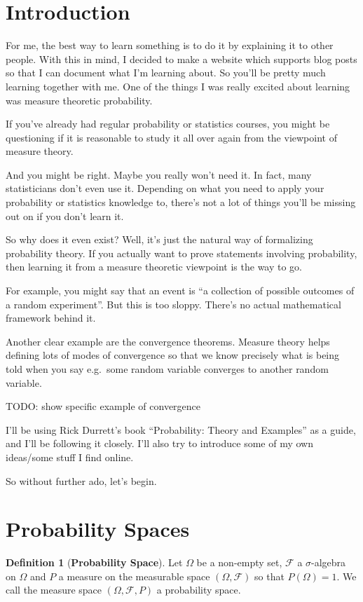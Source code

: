 \documentclass{article}
\theoremstyle{definition}
\newtheorem{definition}[theorem]{Definition}
\begin{document}
\section{Introduction}

For me, the best way to learn something is to do it by explaining it to other people. With this in mind,
I decided to make a website which supports blog posts so that I can document what I'm learning about.
So you'll be pretty much learning together with me. One of the things I was really excited about learning was
measure theoretic probability.

If you've already had regular probability or statistics courses, you might be questioning if it is
reasonable to study it all over again from the viewpoint of measure theory.

And you might be right. Maybe you really won't need it. In fact, many statisticians don't even use it.
Depending on what you need to apply your probability or statistics knowledge to, there's not a lot of
things you'll be missing out on if you don't learn it.

So why does it even exist? Well, it's just the natural way of formalizing probability theory. If you
actually want to prove statements involving probability, then learning it from a measure theoretic
viewpoint is the way to go.

For example, you might say that an event is ``a collection of possible outcomes of a random experiment''.
But this is too sloppy. There's no actual mathematical framework behind it.

Another clear example are the convergence theorems. Measure theory helps defining lots of modes of
convergence so that we know precisely what is being told when you say e.g.\ some random variable
converges to another random variable.

TODO: show specific example of convergence

I'll be using Rick Durrett's book ``Probability: Theory and Examples'' as a guide, and I'll be following it closely.
I'll also try to introduce some of my own ideas/some stuff I find online.

So without further ado, let's begin.

\section{Probability Spaces}

\begin{definition}[\textbf{Probability Space}]
    Let $\Omega$ be a non-empty set, $\mathcal{F}$ a $\sigma$-algebra
    on $\Omega$ and $P$ a measure on the measurable space $(\Omega, \mathcal{F})$ so that $P(\Omega)=1$. We
    call the measure space $(\Omega, \mathcal{F}, P)$ a probability space.
\end{definition}
\end{document}
